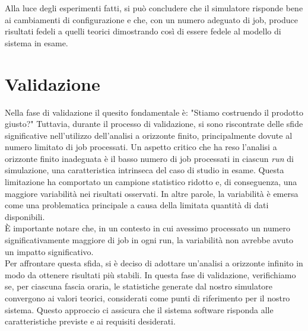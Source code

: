 \documentclass[a4paper, 12pt]{article}
\begin{document}
Alla luce degli esperimenti fatti, si può concludere che il simulatore risponde bene ai cambiamenti di configurazione e che, con un numero adeguato di job, produce risultati fedeli a quelli teorici dimostrando così di essere fedele al modello di sistema in esame. 


\section{Validazione}
Nella fase di validazione il quesito fondamentale è: "Stiamo costruendo il prodotto giusto?" Tuttavia, durante il processo di validazione, si sono riscontrate delle sfide significative nell'utilizzo dell'analisi a orizzonte finito, principalmente dovute al numero limitato di job processati. Un aspetto critico che ha reso l'analisi a orizzonte finito inadeguata è il basso numero di job processati in ciascun \textit{run} di simulazione, una caratteristica intrinseca del caso di studio in esame. Questa limitazione ha comportato un campione statistico ridotto e, di conseguenza, una maggiore variabilità nei risultati osservati. In altre parole, la variabilità è emersa come una problematica principale a causa della limitata quantità di dati disponibili. \\

È importante notare che, in un contesto in cui avessimo processato un numero significativamente maggiore di job in ogni run, la variabilità non avrebbe avuto un impatto significativo. \\

Per affrontare questa sfida, si è deciso di adottare un'analisi a orizzonte infinito in modo da ottenere risultati più stabili. In questa fase di validazione, verifichiamo se, per ciascuna fascia oraria, le statistiche generate dal nostro simulatore convergono ai valori teorici, considerati come punti di riferimento per il nostro sistema. Questo approccio ci assicura che il sistema software risponda alle caratteristiche previste e ai requisiti desiderati. 
\end{document}
